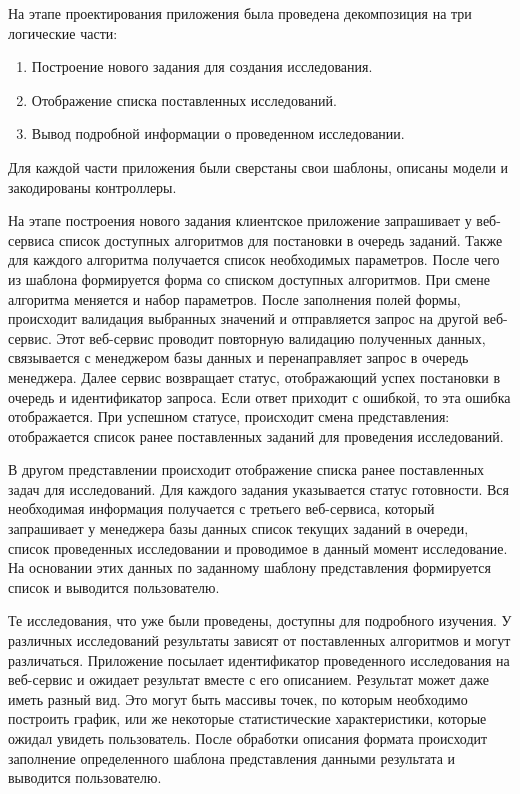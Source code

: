 На этапе проектирования приложения была проведена декомпозиция на три логические части:

\begin{enumerate}
 \item Построение нового задания для создания исследования.
 \item Отображение списка поставленных исследований.
 \item Вывод подробной информации о проведенном исследовании.
\end{enumerate}

Для каждой части приложения были сверстаны свои шаблоны, описаны модели и закодированы контроллеры.

На этапе построения нового задания клиентское приложение запрашивает у веб-сервиса список доступных алгоритмов для постановки в очередь заданий. Также для каждого алгоритма получается список необходимых параметров. После чего из шаблона формируется форма со списком доступных алгоритмов. При смене алгоритма меняется и набор параметров. После заполнения полей формы, происходит валидация выбранных значений и отправляется запрос на другой веб-сервис. Этот веб-сервис проводит повторную валидацию полученных данных, связывается с менеджером базы данных и перенаправляет запрос в очередь менеджера. Далее сервис возвращает статус, отображающий успех постановки в очередь и идентификатор запроса. Если ответ приходит с ошибкой, то эта ошибка отображается. При успешном статусе, происходит смена представления: отображается список ранее поставленных заданий для проведения исследований.

В другом представлении происходит отображение списка ранее поставленных задач для исследований. Для каждого задания указывается статус готовности. Вся необходимая информация получается с третьего веб-сервиса, который запрашивает у менеджера базы данных список текущих заданий в очереди, список проведенных исследовании и проводимое в данный момент исследование. На основании этих данных по заданному шаблону представления формируется список и выводится пользователю.

Те исследования, что уже были проведены, доступны для подробного изучения. У различных исследований результаты зависят от поставленных алгоритмов и могут различаться. Приложение посылает идентификатор проведенного исследования на веб-сервис и ожидает результат вместе с его описанием. Результат может даже иметь разный вид. Это могут быть массивы точек, по которым необходимо построить график, или же некоторые статистические характеристики, которые ожидал увидеть пользователь. После обработки описания формата происходит заполнение определенного шаблона представления данными результата и выводится пользователю.